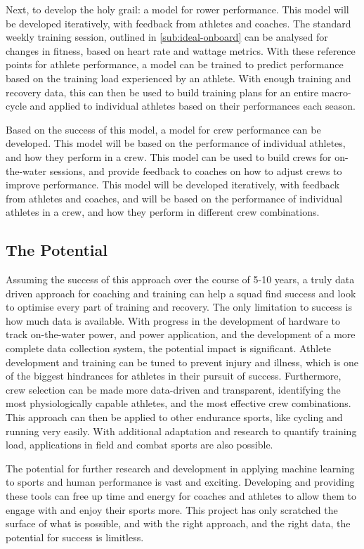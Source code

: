 Next, to develop the holy grail: a model for rower performance. This model will be developed iteratively, with feedback from athletes and coaches. The standard weekly training session, outlined in \autoref{sub:ideal-onboard} can be analysed for changes in fitness, based on heart rate and wattage metrics. With these reference points for athlete performance, a model can be trained to predict performance based on the training load experienced by an athlete. With enough training and recovery data, this can then be used to build training plans for an entire macro-cycle and applied to individual athletes based on their performances each season. 

Based on the success of this model, a model for crew performance can be developed. This model will be based on the performance of individual athletes, and how they perform in a crew. This model can be used to build crews for on-the-water sessions, and provide feedback to coaches on how to adjust crews to improve performance. This model will be developed iteratively, with feedback from athletes and coaches, and will be based on the performance of individual athletes in a crew, and how they perform in different crew combinations.

\subsection{The Potential}
Assuming the success of this approach over the course of 5-10 years, a truly data driven approach for coaching and training can help a squad find success and look to optimise every part of training and recovery. The only limitation to success is how much data is available. With progress in the development of hardware to track on-the-water power, and power application, and the development of a more complete data collection system, the potential impact is significant. Athlete development and training can be tuned to prevent injury and illness, which is one of the biggest hindrances for athletes in their pursuit of success. Furthermore, crew selection can be made more data-driven and transparent, identifying the most physiologically capable athletes, and the most effective crew combinations. This approach can then be applied to other endurance sports, like cycling and running very easily. With additional adaptation and research to quantify training load, applications in field and combat sports are also possible.

The potential for further research and development in applying machine learning to sports and human performance is vast and exciting. Developing and providing these tools can free up time and energy for coaches and athletes to allow them to engage with and enjoy their sports more. This project has only scratched the surface of what is possible, and with the right approach, and the right data, the potential for success is limitless.

